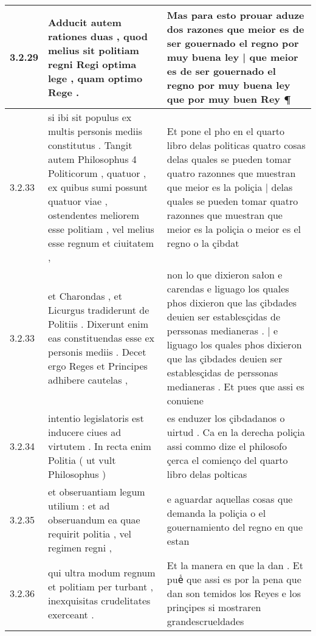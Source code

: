 \begin{tabular}{|p{1cm}|p{6.5cm}|p{6.5cm}|}
3.2.29 & Adducit autem rationes duas , quod melius sit politiam regni Regi optima lege , quam optimo Rege . & Mas para esto prouar aduze dos razones que meior es de ser gouernado el regno por muy buena ley | que meior es de ser gouernado el regno por muy buena ley que por muy buen Rey ¶ \\\hline
3.2.33 & si ibi sit populus ex multis personis mediis constitutus . Tangit autem Philosophus 4 Politicorum , quatuor , ex quibus sumi possunt quatuor viae , ostendentes meliorem esse politiam , vel melius esse regnum et ciuitatem , & Et pone el pho en el quarto libro delas politicas quatro cosas delas quales se pueden tomar quatro razonnes que muestran que meior es la poliçia | delas quales se pueden tomar quatro razonnes que muestran que meior es la poliçia o meior es el regno o la çibdat \\\hline
3.2.33 & et Charondas , et Licurgus tradiderunt de Politiis . Dixerunt enim eas constituendas esse ex personis mediis . Decet ergo Reges et Principes adhibere cautelas , & non lo que dixieron sałon e carendas e liguago los quales phos dixieron que las çibdades deuien ser establesçidas de perssonas medianeras . | e liguago los quales phos dixieron que las çibdades deuien ser establesçidas de perssonas medianeras . Et pues que assi es conuiene \\\hline
3.2.34 & intentio legislatoris est inducere ciues ad virtutem . In recta enim Politia ( ut vult Philosophus ) & es enduzer los çibdadanos o uirtud . Ca en la derecha poliçia assi commo dize el philosofo çerca el comienço del quarto libro delas polticas \\\hline
3.2.35 & et obseruantiam legum utilium : et ad obseruandum ea quae requirit politia , vel regimen regni , & e aguardar aquellas cosas que demanda la poliçia o el gouernamiento del regno en que estan \\\hline
3.2.36 & qui ultra modum regnum et politiam per turbant , inexquisitas crudelitates exerceant . & Et la manera en que la dan . Et pueᷤ que assi es por la pena que dan son temidos los Reyes e los prinçipes si mostraren grandescrueldades \\\hline

\end{tabular}
